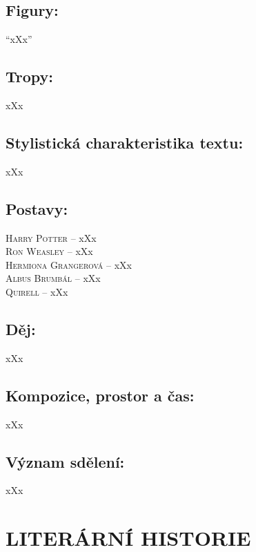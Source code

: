 \documentclass[A4paper]{extarticle} %
\begin{document}
\subsection*{Figury:}
\noindent 
\enquote{xXx}

\subsection*{Tropy:}
\noindent 
xXx

\subsection*{Stylistická charakteristika textu:}
\noindent 
xXx

\subsection*{Postavy:}
\noindent 
\textsc{Harry Potter --} xXx \\
\textsc{Ron Weasley --} xXx \\
\textsc{Hermiona Grangerová --} xXx \\
\textsc{Albus Brumbál --} xXx \\
\textsc{Quirell --} xXx \\

\subsection*{Děj:}
\noindent 
xXx

\subsection*{Kompozice, prostor a čas:}
\noindent 
xXx

\subsection*{Význam sdělení:}
\noindent 
xXx

\section*{LITERÁRNÍ HISTORIE}


\end{document}
